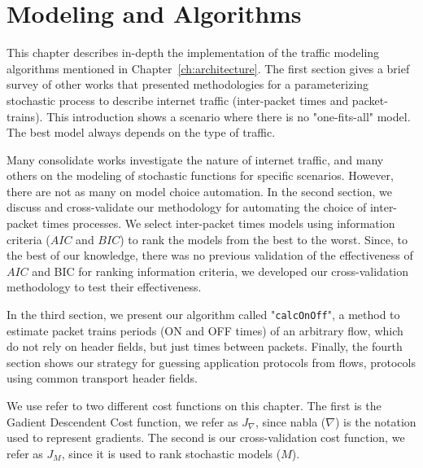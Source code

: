 \chapter{Modeling and Algorithms}\label{ch:modeling-evaluation}




This chapter describes in-depth the implementation of the traffic modeling algorithms mentioned in Chapter~\ref{ch:architecture}. The first section gives a brief survey of other works that presented methodologies for a parameterizing stochastic process to describe internet traffic (inter-packet times and packet-trains). This introduction shows a scenario where there is no "one-fits-all" model. The best model always depends on the type of traffic. 

Many consolidate works investigate the nature of internet traffic, and many others on the modeling of stochastic functions for specific scenarios. However, there are not as many on model choice automation. In the second section, we discuss and cross-validate our methodology for automating the choice of inter-packet times processes. We select inter-packet times models using information criteria ($AIC$ and $BIC$) to rank the models from the best to the worst.  Since, to the best of our knowledge, there was no previous validation of the effectiveness of $AIC$ and BIC for ranking information criteria, we developed our cross-validation methodology to test their effectiveness.  

In the third section, we present our algorithm called "\texttt{calcOnOff}", a method to estimate packet trains periods (ON and OFF times) of an arbitrary flow, which do not rely on header fields, but just times between packets. Finally, the fourth section shows our strategy for guessing application protocols from flows, protocols using common transport header fields.


We use refer to two different cost functions on this chapter. The first is the Gadient Descendent Cost function, we refer as $J_\nabla$, since nabla ($\nabla$) is the notation used to represent gradients. The second is our cross-validation cost function, we refer as $J_M$, since it is used to rank stochastic models ($M$).


